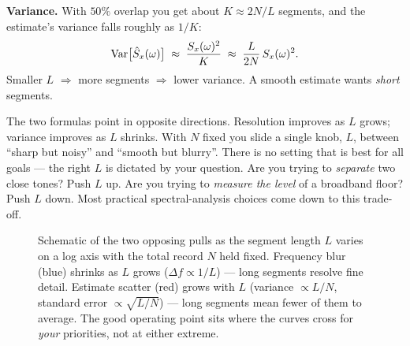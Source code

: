 \textbf{Variance.} With $50\%$ overlap you get about $K\approx 2N/L$ segments, and
the estimate's variance falls roughly as $1/K$:
\[
\operatorname{Var}\!\big[\hat{S}_x(\omega)\big] \;\approx\; \frac{S_x(\omega)^2}{K} \;\approx\;
\frac{L}{2N}\,S_x(\omega)^2 .
\]
Smaller $L$ $\Rightarrow$ more segments $\Rightarrow$ lower variance. A smooth
estimate wants \emph{short} segments.

\begin{aestheticbox}
The two formulas point in opposite directions. Resolution improves
as $L$ grows; variance improves as $L$ shrinks. With $N$ fixed you slide a single
knob, $L$, between ``sharp but noisy'' and ``smooth but blurry''. There is no
setting that is best for all goals --- the right $L$ is dictated by your question.
Are you trying to \emph{separate} two close tones? Push $L$ up. Are you trying to
\emph{measure the level} of a broadband floor? Push $L$ down. Most practical
spectral-analysis choices come down to this trade-off.
\end{aestheticbox}

\begin{figure}[H]
\centering
{}
\caption{Schematic of the two opposing pulls as the segment length $L$ varies on a log axis with the total record
$N$ held fixed. Frequency blur (blue) shrinks as $L$ grows ($\Delta f \propto 1/L$) --- long segments
resolve fine detail. Estimate scatter (red) grows with $L$ (variance $\propto L/N$, standard error $\propto \sqrt{L/N}$) --- long segments mean
fewer of them to average. The good operating point sits where the curves cross for
\emph{your} priorities, not at either extreme.}
\label{ch21:fig-tradeoff}
\end{figure}

